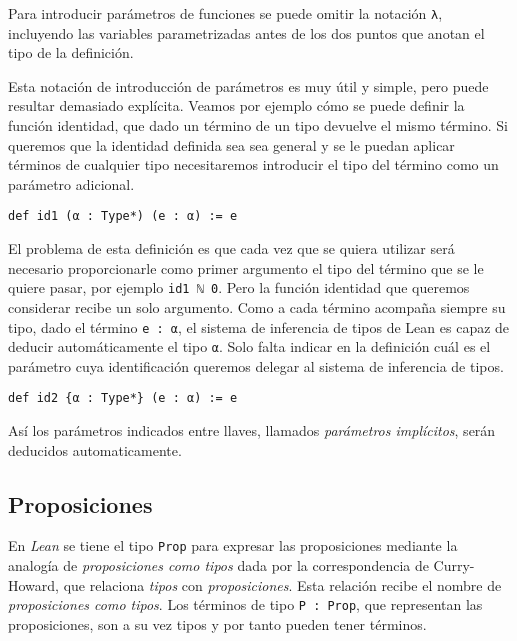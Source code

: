 Para introducir parámetros de funciones se puede omitir la notación
\lstinline{λ}, incluyendo las variables parametrizadas antes de los dos puntos
que anotan el tipo de la definición.

Esta notación de introducción de parámetros es muy útil y simple, pero puede
resultar demasiado explícita. Veamos por ejemplo cómo se puede definir la
función identidad, que dado un término de un tipo devuelve el mismo término.
Si queremos que la identidad definida sea sea general y se le puedan aplicar términos
de cualquier tipo necesitaremos introducir el tipo del término como un parámetro
adicional.

\begin{lstlisting}
def id1 (α : Type*) (e : α) := e
\end{lstlisting}

El problema de esta definición es que cada vez que se quiera utilizar será
necesario proporcionarle como primer argumento el tipo del término que se le
quiere pasar, por ejemplo \lstinline{id1 ℕ 0}.
Pero la función identidad que queremos considerar recibe un solo argumento.
Como a cada término acompaña siempre su tipo, dado el término \lstinline{e : α},
el sistema de inferencia de tipos de Lean es capaz de deducir automáticamente el
tipo \lstinline{α}. Solo falta indicar en la definición cuál es el parámetro
cuya identificación queremos delegar al sistema de inferencia de tipos.

\begin{lstlisting}
def id2 {α : Type*} (e : α) := e
\end{lstlisting}

Así los parámetros indicados entre llaves, llamados \textit{parámetros
	implícitos}, serán deducidos automaticamente.


\subsection{Proposiciones}

En \textit{Lean} se tiene el tipo \lstinline{Prop} para expresar las
proposiciones mediante la analogía de \textit{proposiciones como tipos} dada por
la correspondencia de Curry-Howard, que relaciona \textit{tipos} con
\textit{proposiciones}. Esta relación recibe el nombre de \textit{proposiciones
	como tipos}. Los términos de tipo \lstinline{P : Prop}, que
representan las proposiciones, son a su vez tipos y por tanto pueden tener términos.

